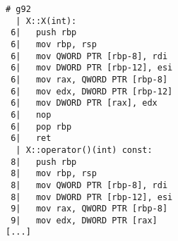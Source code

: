 \begin{lstlisting}[language={},numbers=none,title=\href{https://godbolt.org/z/mFxN4-}{\texttt{godbolt.org/z/mFxN4-}}]
# g92 
  | X::X(int):
 6|   push rbp
 6|   mov rbp, rsp
 6|   mov QWORD PTR [rbp-8], rdi
 6|   mov DWORD PTR [rbp-12], esi
 6|   mov rax, QWORD PTR [rbp-8]
 6|   mov edx, DWORD PTR [rbp-12]
 6|   mov DWORD PTR [rax], edx
 6|   nop
 6|   pop rbp
 6|   ret
  | X::operator()(int) const:
 8|   push rbp
 8|   mov rbp, rsp
 8|   mov QWORD PTR [rbp-8], rdi
 8|   mov DWORD PTR [rbp-12], esi
 9|   mov rax, QWORD PTR [rbp-8]
 9|   mov edx, DWORD PTR [rax]
[...]
\end{lstlisting}

